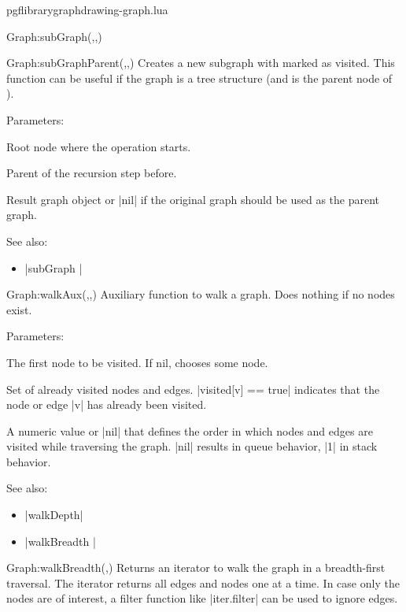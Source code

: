 \begin{filedescription}{pgflibrarygraphdrawing-graph.lua}
\begin{luacommand}{{Graph:subGraph}(,,)}
\end{luacommand}
\begin{luacommand}{{Graph:subGraphParent}(,,)}
Creates a new subgraph with  marked as visited.  This function can be useful if the graph is a tree structure (and  is the parent node of ). 

Parameters:
\begin{parameterdescription}
	\item[\meta{root}] Root node where the operation starts.\item[\meta{parent}] Parent of the recursion step before.\item[\meta{graph}] Result graph object or |nil| if the original graph should be used as the parent graph. 
\end{parameterdescription}



See also:
\begin{itemize}
	\item[] |subGraph |
\end{itemize}

\end{luacommand}
\begin{luacommand}{{Graph:walkAux}(,,)}
Auxiliary function to walk a graph. Does nothing if no nodes exist. 

Parameters:
\begin{parameterdescription}
	\item[\meta{root}] The first node to be visited. If nil, chooses some node.\item[\meta{visited}] Set of already visited nodes and edges. |visited[v] == true| indicates that the node or edge |v| has already been visited.\item[\meta{remove\_index}] A numeric value or |nil| that defines the order in which nodes and edges are visited while traversing the graph. |nil| results in queue behavior, |1| in stack behavior. 
\end{parameterdescription}



See also:
\begin{itemize}
	\item[] |walkDepth|\item[] |walkBreadth |
\end{itemize}

\end{luacommand}
\begin{luacommand}{{Graph:walkBreadth}(,)}
Returns an iterator to walk the graph in a breadth-first traversal.  The iterator returns all edges and nodes one at a time. In case only the nodes are of interest, a filter function like |iter.filter| can be used to ignore edges. 


\end{luacommand}
\end{filedescription}
